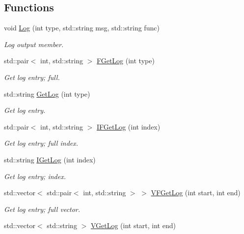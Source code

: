 \subsection*{Functions}
\begin{DoxyCompactItemize}
\item 
void \hyperlink{namespacepessum_1_1log_a78616d558dafb843a51b858ab96281e1}{Log} (int type, std\+::string msg, std\+::string func)
\begin{DoxyCompactList}\small\item\em Log output member. \end{DoxyCompactList}\item 
std\+::pair$<$ int, std\+::string $>$ \hyperlink{namespacepessum_1_1log_af90cce6e7194fdefd3c665aba4195830}{F\+Get\+Log} (int type)
\begin{DoxyCompactList}\small\item\em Get log entry; full. \end{DoxyCompactList}\item 
std\+::string \hyperlink{namespacepessum_1_1log_abfb7da9bcd4948bc24112a88417d272a}{Get\+Log} (int type)
\begin{DoxyCompactList}\small\item\em Get log entry. \end{DoxyCompactList}\item 
std\+::pair$<$ int, std\+::string $>$ \hyperlink{namespacepessum_1_1log_a27f5149706f331d518d1e6a1867c9d8d}{I\+F\+Get\+Log} (int index)
\begin{DoxyCompactList}\small\item\em Get log entry; full index. \end{DoxyCompactList}\item 
std\+::string \hyperlink{namespacepessum_1_1log_a4b198279b4ed44ed0a58995ac1a03c96}{I\+Get\+Log} (int index)
\begin{DoxyCompactList}\small\item\em Get log entry; index. \end{DoxyCompactList}\item 
std\+::vector$<$ std\+::pair$<$ int, std\+::string $>$ $>$ \hyperlink{namespacepessum_1_1log_a65630db6abcfb529e61e5df0a492ebf4}{V\+F\+Get\+Log} (int start, int end)
\begin{DoxyCompactList}\small\item\em Get log entry; full vector. \end{DoxyCompactList}\item 
std\+::vector$<$ std\+::string $>$ \hyperlink{namespacepessum_1_1log_a566d939fa6ead9aa60de41bc071ab710}{V\+Get\+Log} (int start, int end)

\end{DoxyCompactItemize}
